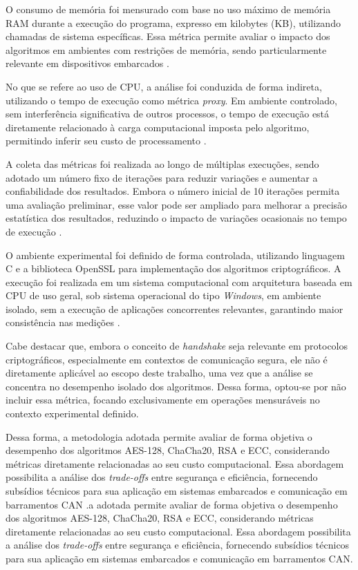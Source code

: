 O consumo de memória foi mensurado com base no uso máximo de memória RAM durante a execução do programa, expresso em kilobytes (KB), utilizando chamadas de sistema específicas. Essa métrica permite avaliar o impacto dos algoritmos em ambientes com restrições de memória, sendo particularmente relevante em dispositivos embarcados \cite{silva2016case}.

No que se refere ao uso de CPU, a análise foi conduzida de forma indireta, utilizando o tempo de execução como métrica \textit{proxy}. Em ambiente controlado, sem interferência significativa de outros processos, o tempo de execução está diretamente relacionado à carga computacional imposta pelo algoritmo, permitindo inferir seu custo de processamento \cite{pham2017development}.

A coleta das métricas foi realizada ao longo de múltiplas execuções, sendo adotado um número fixo de iterações para reduzir variações e aumentar a confiabilidade dos resultados. Embora o número inicial de 10 iterações permita uma avaliação preliminar, esse valor pode ser ampliado para melhorar a precisão estatística dos resultados, reduzindo o impacto de variações ocasionais no tempo de execução \cite{georges2007statistically}.

O ambiente experimental foi definido de forma controlada, utilizando linguagem C e a biblioteca OpenSSL para implementação dos algoritmos criptográficos. A execução foi realizada em um sistema computacional com arquitetura baseada em CPU de uso geral, sob sistema operacional do tipo \textit{Windows}, em ambiente isolado, sem a execução de aplicações concorrentes relevantes, garantindo maior consistência nas medições \cite{dierks2008transport}.

Cabe destacar que, embora o conceito de \textit{handshake} seja relevante em protocolos criptográficos, especialmente em contextos de comunicação segura, ele não é diretamente aplicável ao escopo deste trabalho, uma vez que a análise se concentra no desempenho isolado dos algoritmos. Dessa forma, optou-se por não incluir essa métrica, focando exclusivamente em operações mensuráveis no contexto experimental definido.

Dessa forma, a metodologia adotada permite avaliar de forma objetiva o desempenho dos algoritmos AES-128, ChaCha20, RSA e ECC, considerando métricas diretamente relacionadas ao seu custo computacional. Essa abordagem possibilita a análise dos \textit{trade-offs} entre segurança e eficiência, fornecendo subsídios técnicos para sua aplicação em sistemas embarcados e comunicação em barramentos CAN \cite{roman2011securing}.a adotada permite avaliar de forma objetiva o desempenho dos algoritmos AES-128, ChaCha20, RSA e ECC, considerando métricas diretamente relacionadas ao seu custo computacional. Essa abordagem possibilita a análise dos \textit{trade-offs} entre segurança e eficiência, fornecendo subsídios técnicos para sua aplicação em sistemas embarcados e comunicação em barramentos CAN.

